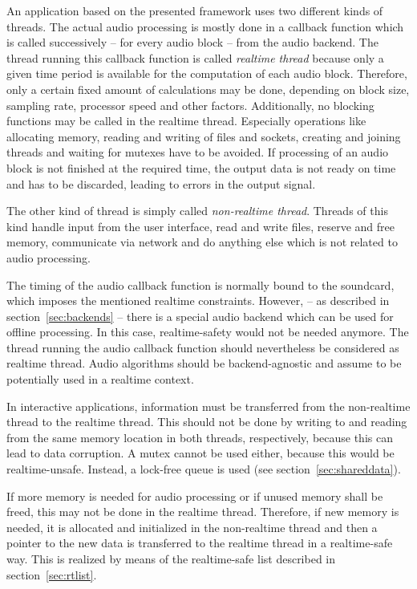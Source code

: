 \documentclass[11pt,letterpaper]{article}
\begin{document}
An application based on the presented framework uses two different kinds of
threads.
The actual audio processing is mostly done in a callback function which is
called successively -- for every audio block -- from the audio backend.
The thread running this callback function is called \emph{realtime thread}
because only a given time period is available for the computation of each
audio block. Therefore, only
a certain fixed amount of calculations may be done, depending on block size,
sampling rate, processor speed and other factors.
Additionally, no blocking functions may be called in the realtime thread.
Especially operations like allocating memory, reading and writing of files and
sockets, creating and joining threads and waiting for mutexes
have to be avoided.
If processing of an audio block is not finished at the required time, the
output data is not ready on time and has to be discarded, leading to errors in
the output signal.

The other kind of thread is simply called \emph{non-realtime thread}.
Threads of this kind handle input from the user interface, read and write files,
reserve and free memory, communicate via network and do anything else which is
not related to audio processing.

The timing of the audio callback function is normally bound to the soundcard,
which imposes the mentioned realtime constraints.
However, -- as described in section~\ref{sec:backends} -- there is a special
audio backend which can be used for offline processing.
In this case, realtime-safety would not be needed anymore.
The thread running the audio callback function should nevertheless be considered
as realtime thread.
Audio algorithms should be backend-agnostic and assume to be
potentially used in a realtime context.

In interactive applications, information must be transferred from the
non-realtime thread to the realtime thread.
This should not be done by writing to and reading from the same memory location in
both threads, respectively, because this can lead to data corruption.
A mutex cannot be used either, because this would be realtime-unsafe.
Instead, a lock-free queue is used (see section~\ref{sec:shareddata}).

If more memory is needed for audio processing or if unused memory shall be
freed, this may not be done in the realtime thread.
Therefore, if new memory is needed, it is allocated and initialized in the
non-realtime thread and then a pointer to the new data is transferred to the
realtime thread in a realtime-safe way.
This is realized by means of the realtime-safe list described in
section~\ref{sec:rtlist}.
\end{document}
